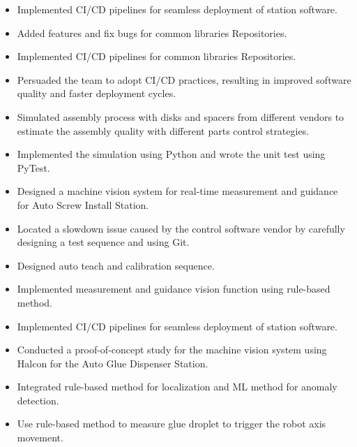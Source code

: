 \documentclass[11pt,a4paper,sans]{moderncv}
\begin{document}
\begin{itemize}
    \item Implemented CI/CD pipelines for seamless deployment of station software.
    \item Added features and fix bugs for common libraries Repositories.
    \item Implemented CI/CD pipelines for common libraries Repositories.
    \item Persuaded the team to adopt CI/CD practices, resulting in improved software quality and faster deployment cycles.
\end{itemize}

\begin{itemize}
    \item Simulated assembly process with disks and spacers from different vendors to estimate the assembly quality with different parts control strategies.
    \item Implemented the simulation using Python and wrote the unit test using PyTest.
\end{itemize}

\begin{itemize}
    \item Designed a machine vision system for real-time measurement and guidance for Auto Screw Install Station.
    \item Located a slowdown issue caused by the control software vendor by carefully designing a test sequence and using Git.
    \item Designed auto teach and calibration sequence.
    \item Implemented measurement and guidance vision function using rule-based method.
    \item Implemented CI/CD pipelines for seamless deployment of station software.
\end{itemize}

\begin{itemize}
    \item Conducted a proof-of-concept study for the machine vision system using Halcon for the Auto Glue Dispenser Station.
    \item Integrated rule-based method for localization and ML method for anomaly detection.
    \item Use rule-based method to measure glue droplet to trigger the robot axis movement.
\end{itemize}
\end{document}
